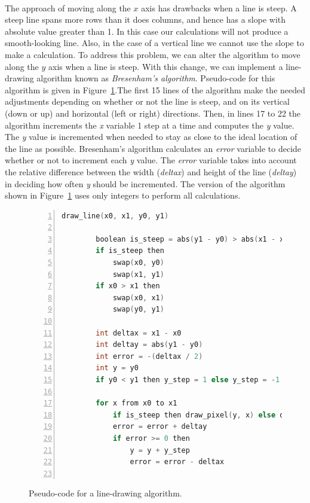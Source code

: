 \documentclass[epsfig,10pt,fullpage]{article}
\begin{document}
~\\
\noindent
The approach of moving along the $x$ axis has drawbacks when a line is steep. A steep line
spans more rows than it does columns, and hence has a slope with absolute value greater than 
1.  In this case our calculations will not produce a smooth-looking line.  Also, in the case
of a vertical line we cannot use the slope to make a calculation.  To address this 
problem, we can alter the algorithm to move along the $y$ axis when a line is steep. With 
this change, we can implement a line-drawing algorithm known as {\it Bresenham's algorithm}.
Pseudo-code for this algorithm is given in Figure~\ref{fig:line_algorithm}.The first 15
lines of the algorithm make the needed adjustments depending on whether or not the line is
steep, and on its vertical (down or up) and horizontal (left or right) directions.
Then, in lines 17 to 22 the algorithm increments the {\it x} variable 1 step at a time
and computes the {\it y} value. The {\it y} value is incremented when needed to stay as
close to the ideal location of the line as possible. Bresenham's algorithm calculates an
{\it error} variable to decide whether or not to increment each {\it y} value.
The {\it error} variable takes into account the relative difference
between the width ({\it deltax}) and height of the line ({\it deltay}) in deciding
how often {\it y} should be incremented. The version of the algorithm shown in 
Figure~\ref{fig:line_algorithm} uses only integers to perform all calculations. 

\begin{figure}[H]
\centering
\begin{lstlisting}[language=C, numbers=left, stepnumber=1, xleftmargin=1cm, morekeywords={then}]
  draw_line(x0, x1, y0, y1)
		
		boolean is_steep = abs(y1 - y0) > abs(x1 - x0)
		if is_steep then
			swap(x0, y0)
			swap(x1, y1)
		if x0 > x1 then
			swap(x0, x1)
			swap(y0, y1)
			
		int deltax = x1 - x0
		int deltay = abs(y1 - y0)
		int error = -(deltax / 2)
		int y = y0
		if y0 < y1 then y_step = 1 else y_step = -1
		
		for x from x0 to x1
			if is_steep then draw_pixel(y, x) else draw_pixel(x, y)
			error = error + deltay
			if error >= 0 then
				y = y + y_step
				error = error - deltax
			
\end{lstlisting}
\caption{Pseudo-code for a line-drawing algorithm.}
\label{fig:line_algorithm}
\end{figure}
\end{document}
